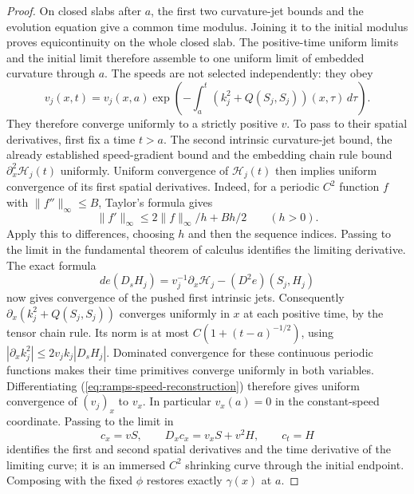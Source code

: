 \begin{proof}
On closed slabs after $a$, the first two curvature-jet bounds
and the evolution equation give a common time modulus.
Joining it to the initial modulus proves equicontinuity
on the whole closed slab.  The positive-time uniform limits
and the initial limit therefore assemble to one uniform
limit of embedded curvature through $a$.
The speeds are not selected independently: they obey
\begin{equation}\label{eq:ramps-speed-reconstruction}
 v_j(x,t)=v_j(x,a)\exp\left(-\int_a^t
              (k_j^2+Q(S_j,S_j))(x,\tau)\,d\tau\right).
\end{equation}
They therefore converge uniformly to a strictly positive $v$.
To pass to their spatial derivatives, first fix a time $t>a$.
The second intrinsic curvature-jet bound, the already established
speed-gradient bound and the embedding chain rule bound
$\partial_x^2\mathcal H_j(t)$ uniformly.  Uniform convergence
of $\mathcal H_j(t)$ then implies uniform convergence of its
first spatial derivatives.  Indeed, for a periodic $C^2$ function
$f$ with $\|f''\|_\infty\leq B$, Taylor's formula gives
\[
 \|f'\|_\infty\leq2\|f\|_\infty/h+Bh/2\qquad(h>0).
\]
Apply this to differences, choosing $h$ and then the sequence
indices.  Passing to the limit in the fundamental theorem of
calculus identifies the limiting derivative.
The exact formula
\[
 de(D_sH_j)=v_j^{-1}\partial_x\mathcal H_j
                                  -(D^2e)(S_j,H_j)
\]
now gives convergence of the pushed first intrinsic jets.
Consequently $\partial_x(k_j^2+Q(S_j,S_j))$ converges uniformly
in $x$ at each positive time, by the tensor chain rule.
Its norm is at most $C(1+(t-a)^{-1/2})$, using
$|\partial_xk_j^2|\leq2v_j k_j|D_sH_j|$.
Dominated convergence for these continuous periodic functions
makes their time primitives converge uniformly in both variables.
Differentiating (\ref{eq:ramps-speed-reconstruction}) therefore
gives uniform convergence of $(v_j)_x$ to $v_x$.
In particular $v_x(a)=0$ in the constant-speed coordinate.
Passing to the limit in
\[
 c_x=vS,\qquad D_xc_x=v_xS+v^2H,\qquad c_t=H
\]
identifies the first and second spatial derivatives and the time derivative
of the limiting curve; it is an immersed $C^2$ shrinking curve through the
initial endpoint.  Composing with the fixed $\phi$ restores exactly
$\gamma(x)$ at $a$.


\end{proof}
